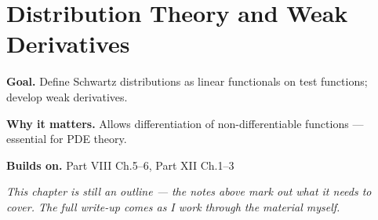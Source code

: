 \chapter{Distribution Theory and Weak Derivatives}
\label{ch:12-functional-analysis-and-spectral-theory-07}

\begin{chapterintro}
\textbf{Goal.} Define Schwartz distributions as linear functionals on test functions; develop weak derivatives.

\textbf{Why it matters.} Allows differentiation of non-differentiable functions — essential for PDE theory.

\textbf{Builds on.} Part VIII Ch.5–6, Part XII Ch.1–3
\end{chapterintro}

\textit{This chapter is still an outline --- the notes above mark out what it needs to cover. The full write-up comes as I work through the material myself.}
